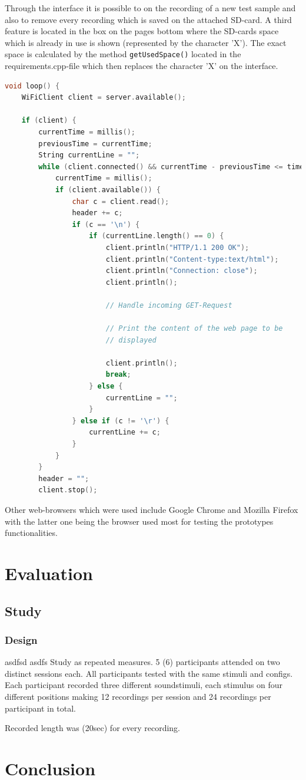 Through the interface it is possible to on the recording of a new test sample and also to remove every recording which is saved on the attached SD-card.
A third feature is located in the box on the pages bottom where the SD-cards space which is already in use is shown (represented by the character 'X').
The exact space is calculated by the method \texttt{getUsedSpace()} located in the requirements.cpp-file which then replaces the character 'X' on the interface. 
\begin{lstlisting}[frame=single, language={c++}, style=style,
	caption={The part of the loop-function which is used to manage the connection of a socket hosted on the microcontroller to a web-client.}, label={lst:WiFiCon},float=!htb]
void loop() {
	WiFiClient client = server.available();
	
	if (client) {
		currentTime = millis();
		previousTime = currentTime;
		String currentLine = "";
		while (client.connected() && currentTime - previousTime <= timeoutTime) {
			currentTime = millis();
			if (client.available()) {
				char c = client.read();
				header += c;
				if (c == '\n') {
					if (currentLine.length() == 0) {
						client.println("HTTP/1.1 200 OK");
						client.println("Content-type:text/html");
						client.println("Connection: close");
						client.println();
						
						// Handle incoming GET-Request
						
						// Print the content of the web page to be
						// displayed
						
						client.println();
						break;
					} else {
						currentLine = "";
					}
				} else if (c != '\r') {
					currentLine += c;
				}
			}
		}
		header = "";
		client.stop();
\end{lstlisting}

Other web-browsers which were used include Google Chrome and Mozilla Firefox with the latter one being the browser used most for testing the prototypes functionalities.

\section{Evaluation}

\subsection{Study}
\subsubsection{Design}
asdfsd\cite{wayman2005introduction} asdfs
Study as repeated measures.
5 (6) participants attended on two distinct sessions each.
All participants tested with the same stimuli and configs.
Each participant recorded three different soundstimuli, each stimulus on four different positions making 12 recordings per session
and 24 recordings per participant in total.

Recorded length was (20sec) for every recording.


\section{Conclusion}
